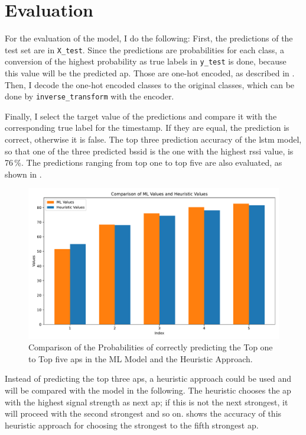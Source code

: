 \chapter{Evaluation}\label{ch:evaluation}

For the evaluation of the model, I do the following:
First, the predictions of the test set are in \texttt{X\_test}.
Since the predictions are probabilities for each class, a conversion of the highest probability as true labels in \texttt{y\_test} is done, because this value will be the predicted \ac{ap}.
Those are one-hot encoded, as described in .
Then, I decode the one-hot encoded classes to the original classes, which can be done by \texttt{inverse\_transform} with the encoder.

Finally, I select the target value of the predictions and compare it with the corresponding true label for the timestamp.
If they are equal, the prediction is correct, otherwise it is false.
The top three prediction accuracy of the \ac{lstm} model, so that one of the three predicted \ac{bssid} is the one with the highest \ac{rssi} value, is 76\,\%.
The predictions ranging from top one to top five are also evaluated, as shown in .

\begin{figure}[h]
    \centering
    \includegraphics*[scale=0.53]{images/comparison_ml_heuristic_1_to_5.pdf}
    \caption{Comparison of the Probabilities of correctly predicting the Top one to Top five \acp{ap} in the ML Model and the Heuristic Approach.}
    \label{fig:comparison_ml_heuristic_1_to_5}
\end{figure}

Instead of predicting the top three \acp{ap}, a heuristic approach could be used and will be compared with the model in the following.
The heuristic chooses the \ac{ap} with the highest signal strength as next \ac{ap}; if this is not the next strongest, it will proceed with the second strongest and so on.
 shows the accuracy of this heuristic approach for choosing the strongest to the fifth strongest \ac{ap}.

